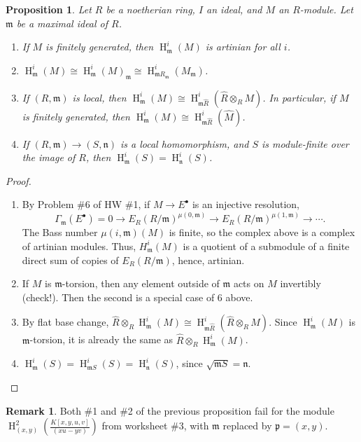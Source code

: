 \documentclass[11pt]{book}
\newtheorem{proposition}[theorem]{Proposition}
\numberwithin{equation}{section}
\numberwithin{theorem}{chapter}
\theoremstyle{definition}
\newtheorem*{basic properties}{Basic Properties}
\newtheorem*{Important Remark}{Important Remark}
\newtheorem{remark}[theorem]{Remark}
\theoremstyle{remark}
\newcommand{\m}{\mathfrak{m}}
\newcommand{\n}{\mathfrak{n}}
\newcommand{\p}{\mathfrak{p}}
\renewcommand{\H}{\operatorname{H}}
\begin{document}
\begin{proposition}
	Let $R$ be a noetherian ring, $I$ an ideal, and $M$ an $R$-module. Let $\m$ be a maximal ideal of $R$.
	\begin{enumerate}
		\item If $M$ is finitely generated, then $\H^i_\m(M)$ is artinian for all $i$.
		\item $\H^i_\m(M)\cong \H^i_\m(M) _\m \cong \H^i_{\m R_\m}(M_\m)$.
		\item If $(R,\m)$ is local, then $\H^i_\m(M)\cong \H^i_{\m \widehat{R}}{(\widehat{R} \otimes_R M)}$. In particular, if $M$ is finitely generated, then $\H^i_\m(M)\cong \H^i_{\m \widehat{R}}{(\widehat{M})}$.
		\item If $(R,\m)\to (S,\n)$ is a local homomorphism, and $S$ is module-finite over the image of $R$, then $\H^i_{\m}(S)=\H^i_{\n}(S)$.
	\end{enumerate}
\end{proposition}
\begin{proof}
	\begin{enumerate}
		\item By Problem \#6 of HW \#1, if $M\to E^{\bullet}$ is an injective resolution,
		\[\Gamma_{\m}(E^\bullet) = 0 \to E_R(R/\m)^{\mu(0,\m)}\to E_R(R/\m)^{\mu(1,\m)}\to \cdots. \]
		The Bass number $\mu(i,\m)(M)$ is finite, so the complex above is a complex of artinian modules. Thus, $H^i_\m(M)$ is a quotient of a submodule of a finite direct sum of copies of $E_R(R/\m)$, hence, artinian.
		\item If $M$ is $\m$-torsion, then any element outside of $\m$ acts on $M$ invertibly (check!). Then the second is a special case of 6 above.
		
		\item By flat base change, $\widehat{R} \otimes_R \H^i_\m(M) \cong \H^i_{\m\widehat{R}}(\widehat{R} \otimes_R M)$. Since $\H^i_\m(M)$ is $\m$-torsion, it is already the same as $\widehat{R} \otimes_R \H^i_\m(M)$.
		
		\item $\H^i_{\m}(S)=\H^i_{\m S}(S)=\H^i_{\n}(S)$, since $\sqrt{\m S}=\n$.
	\end{enumerate}
\end{proof}

\begin{remark}
	Both \#1 and \#2 of the previous proposition fail for the module $\displaystyle \H^2_{(x,y)}\left(\frac{K[x,y,u,v]}{(xu-yv)}\right)$ from worksheet \#3, with $\m$ replaced by $\p=(x,y)$.
\end{remark}
\end{document}
